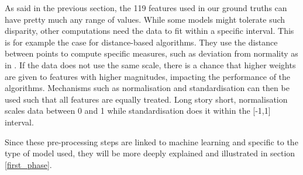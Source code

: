 As said in the previous section, the 119 features used in our ground truths can have pretty much any range of values. While some models might tolerate such disparity, other computations need the data to fit within a specific interval. This is for example the case for distance-based algorithms. They use the distance between points to compute specific measures, such as deviation from normality as in \cite{ugarte-pedrero_structural_2011}. If the data does not use the same scale, there is a chance that higher weights are given to features with higher magnitudes, impacting the performance of the algorithms. Mechanisms such as normalisation and standardisation can then be used such that all features are equally treated. Long story short, normalisation scales data between 0 and 1 while standardisation does it within the [-1,1] interval.

Since these pre-processing steps are linked to machine learning and specific to the type of model used, they will be more deeply explained and illustrated in section \ref{first_phase}.